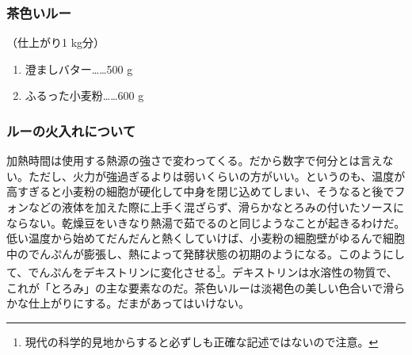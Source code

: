 \begin{recette}

\hypertarget{roux-brun}{%
\subsubsection{茶色いルー}\label{roux-brun}}


 
 

（仕上がり1 kg分）

\begin{enumerate}
\def\labelenumi{\arabic{enumi}.}
\tightlist
\item
  澄ましバター\ldots{}\ldots{}500 g
\item
  ふるった小麦粉\ldots{}\ldots{}600 g
\end{enumerate}

\atoaki{}

\hypertarget{cuisson-des-roux}{%
\subsubsection{ルーの火入れについて}\label{cuisson-des-roux}}


加熱時間は使用する熱源の強さで変わってくる。だから数字で何分とは言えない。ただし、火力が強過ぎるよりは弱いくらいの方がいい。というのも、温度が高すぎると小麦粉の細胞が硬化して中身を閉じ込めてしまい、そうなると後でフォンなどの液体を加えた際に上手く混ざらず、滑らかなとろみの付いたソースにならない。乾燥豆をいきなり熱湯で茹でるのと同じようなことが起きるわけだ。低い温度から始めてだんだんと熱くしていけば、小麦粉の細胞壁がゆるんで細胞中のでんぷんが膨張し、熱によって発酵状態の初期のようになる。このようにして、でんぷんをデキストリンに変化させる\footnote{現代の科学的見地からすると必ずしも正確な記述ではないので注意。}。デキストリンは水溶性の物質で、これが「とろみ」の主な要素なのだ。茶色いルーは淡褐色の美しい色合いで滑らかな仕上がりにする。だまがあってはいけない。


\end{recette}
